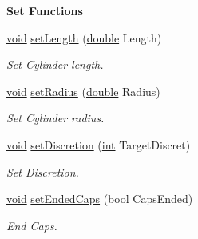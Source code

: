 \begin{Indent}{\bf Set Functions}\par
\begin{DoxyCompactItemize}
\item 
\hyperlink{group___u_a_v_objects_plugin_ga444cf2ff3f0ecbe028adce838d373f5c}{void} \hyperlink{class_g_l_c___cylinder_aec3e06895fdde134f1d73a7810dd8aa1}{set\-Length} (\hyperlink{_super_l_u_support_8h_a8956b2b9f49bf918deed98379d159ca7}{double} Length)
\begin{DoxyCompactList}\small\item\em Set Cylinder length. \end{DoxyCompactList}\item 
\hyperlink{group___u_a_v_objects_plugin_ga444cf2ff3f0ecbe028adce838d373f5c}{void} \hyperlink{class_g_l_c___cylinder_a889f580f01129b7cc37c4035ec9a01ee}{set\-Radius} (\hyperlink{_super_l_u_support_8h_a8956b2b9f49bf918deed98379d159ca7}{double} Radius)
\begin{DoxyCompactList}\small\item\em Set Cylinder radius. \end{DoxyCompactList}\item 
\hyperlink{group___u_a_v_objects_plugin_ga444cf2ff3f0ecbe028adce838d373f5c}{void} \hyperlink{class_g_l_c___cylinder_a051e6432ee2f6a8c26373ba022e06832}{set\-Discretion} (\hyperlink{ioapi_8h_a787fa3cf048117ba7123753c1e74fcd6}{int} Target\-Discret)
\begin{DoxyCompactList}\small\item\em Set Discretion. \end{DoxyCompactList}\item 
\hyperlink{group___u_a_v_objects_plugin_ga444cf2ff3f0ecbe028adce838d373f5c}{void} \hyperlink{class_g_l_c___cylinder_aa182f9c5d385dd350f5174edf7fc815d}{set\-Ended\-Caps} (bool Caps\-Ended)
\begin{DoxyCompactList}\small\item\em End Caps. \end{DoxyCompactList}\end{DoxyCompactItemize}
\end{Indent}
